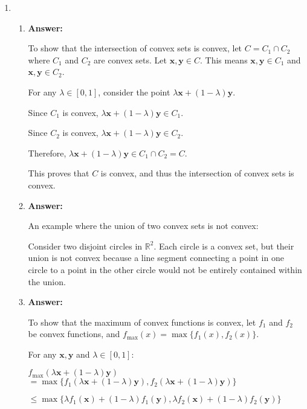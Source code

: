 \documentclass{article}
\newenvironment{answer}
    {\par\noindent\textbf{Answer:}\par}
    {\par}
\begin{document}
\begin{enumerate}
    \item 
    \begin{enumerate}
        \item 
        \begin{answer}
        To show that the intersection of convex sets is convex, let $C = C_1 \cap C_2$ where $C_1$ and $C_2$ are convex sets. Let $\mathbf{x}, \mathbf{y} \in C$. This means $\mathbf{x}, \mathbf{y} \in C_1$ and $\mathbf{x}, \mathbf{y} \in C_2$.

        For any $\lambda \in [0,1]$, consider the point $\lambda\mathbf{x} + (1-\lambda)\mathbf{y}$.
        
        Since $C_1$ is convex, $\lambda\mathbf{x} + (1-\lambda)\mathbf{y} \in C_1$.
        
        Since $C_2$ is convex, $\lambda\mathbf{x} + (1-\lambda)\mathbf{y} \in C_2$.
        
        Therefore, $\lambda\mathbf{x} + (1-\lambda)\mathbf{y} \in C_1 \cap C_2 = C$.
        
        This proves that $C$ is convex, and thus the intersection of convex sets is convex.
        \end{answer}

        \item 
        \begin{answer}
        An example where the union of two convex sets is not convex:
        
        Consider two disjoint circles in $\mathbb{R}^2$. Each circle is a convex set, but their union is not convex because a line segment connecting a point in one circle to a point in the other circle would not be entirely contained within the union.
        \end{answer}

        \item 
        \begin{answer}
        To show that the maximum of convex functions is convex, let $f_1$ and $f_2$ be convex functions, and $f_{\max}(x) = \max\{f_1(x), f_2(x)\}$.
        
        For any $\mathbf{x}, \mathbf{y}$ and $\lambda \in [0,1]$:
        
        $f_{\max}(\lambda\mathbf{x} + (1-\lambda)\mathbf{y})$
        $= \max\{f_1(\lambda\mathbf{x} + (1-\lambda)\mathbf{y}), f_2(\lambda\mathbf{x} + (1-\lambda)\mathbf{y})\}$
        
        $\leq \max\{\lambda f_1(\mathbf{x}) + (1-\lambda)f_1(\mathbf{y}), \lambda f_2(\mathbf{x}) + (1-\lambda)f_2(\mathbf{y})\}$
        

\end{answer}
\end{enumerate}
\end{enumerate}
\end{document}
